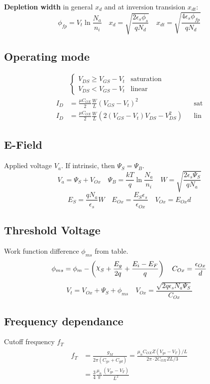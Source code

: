 \documentclass[a4paper, fontsize=8pt, landscape, DIV=1]{scrartcl}
\begin{document}
\begin{multicols*}{4}
    \textbf{Depletion width} in general $x_d$ and at inversion transision $x_{dt}$:
    \[\phi_{fp} = V_t\ln\frac{N_a}{n_i} \quad x_d = \sqrt{\frac{2\epsilon_s\phi_s}{qN_d}} \quad x_{dt} = \sqrt{\frac{4\epsilon_s\phi_{fp}}{qN_d}}\]
    
    \subsection{Operating mode}
    \begin{align*}
      &\begin{cases}
        V_{DS} \geq V_{GS} - V_t & \text{saturation} \\
        V_{DS}  <   V_{GS} - V_t & \text{linear}
      \end{cases} \\
      I_{D} &= \frac{\mu C_{OX}}{2}\frac{W}{L} (V_{GS} - V_t) ^2 && \text{sat} \\
      I_{D} &= \frac{\mu C_{OX}}{2}\frac{W}{L} \left( 2(V_{GS} - V_t) V_{DS} - V_{DS}^2 \right) && \text{lin} 
    \end{align*}

    \subsection{E-Field}
    Applied voltage $V_a$. If intrinsic, then $\Psi_S = \Psi_B$.
    \[ V_a = \Psi_S + V_{Ox} \quad \Psi_B = \frac{kT}{q}\ln\frac{N_a}{n_i} \quad W=\sqrt{\frac{2\epsilon_s\Psi_S}{qN_a}}\]
    \[ E_S = \frac{qN_a}{\epsilon_s}W \quad E_{Ox}=\frac{E_S\epsilon_s}{\epsilon_{Ox}} \quad V_{Ox} = E_{Ox}d \]

    \subsection{Threshold Voltage}
    Work function difference $\phi_{ms}$ from table.
    \[ \phi_{ms} = \phi_m - \left(\altchi_S + \frac{E_g}{2q} + \frac{E_i-E_F}{q}\right)  \quad C_{Ox} = \frac{\epsilon_{Ox}}{d} \]
    \[ V_t = V_{Ox} + \Psi_S + \phi_{ms} \quad V_{Ox} = \frac{\sqrt{2q\epsilon_s N_a \Psi_S}}{C_{Ox}} \]

    \subsection{Frequency dependance}
    Cutoff frequency $f_T$
    \begin{align*} f_T &= \frac{g_M}{2\pi(C_{gs}+C_{gd})}
    = \frac{\mu_n C_{OX} Z(V_{gs} - V_T ) /L }{2\pi\cdot 2C_{OX}ZL/3}  \\
    &= \frac{3}{4}\frac{\mu_n}{\pi}\frac{(V_{gs}-V_T)}{L^2}
    \end{align*}


\end{multicols*}

\setcounter{secnumdepth}{2}
\end{document}
